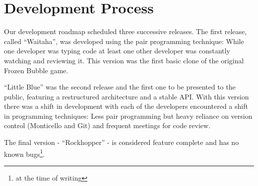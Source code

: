 \section{Development Process}
Our development roadmap scheduled three successive releases. 
The first release, called ``Waitaha'', was developed using 
the pair programming technique: While one developer was 
typing code at least one other developer was constantly 
watching and reviewing it. This version was the first 
basic clone of the original Frozen Bubble game.

``Little Blue'' was the second release and the first one 
to be presented to the public, featuring a restructured 
architecture and a stable API. With this version there was 
a shift in development with each of the developers encountered 
a shift in programming techniques: Less pair programming but heavy 
reliance on version control (Monticello and Git) and frequent 
meetings for code review.

The final version - ``Rockhopper'' - is considered feature complete and has no known bugs\footnote{at the time of writing}.
